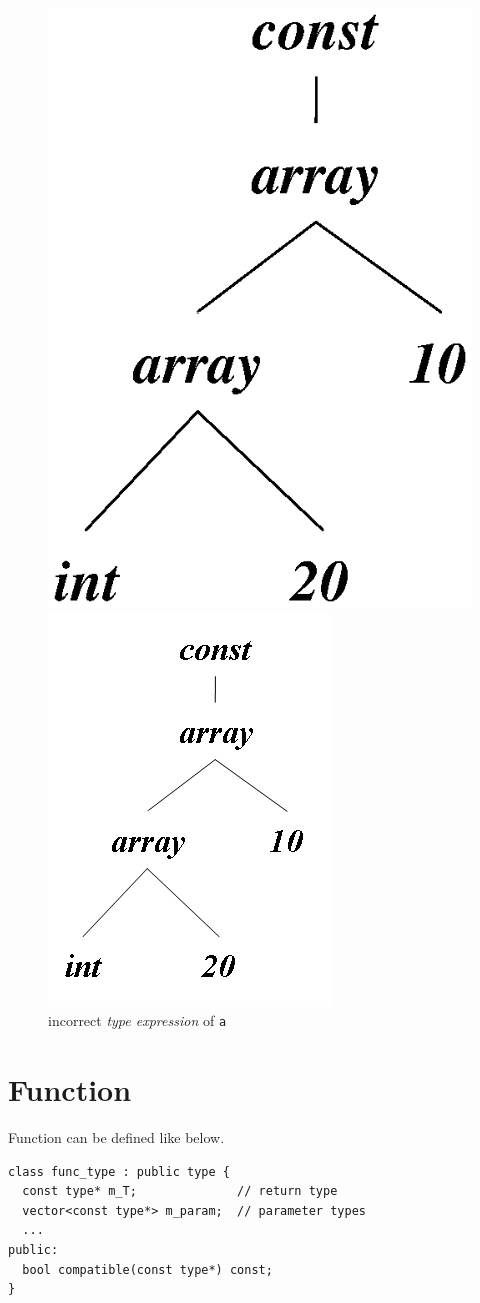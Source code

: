 \begin{figure}[htbp]
\begin{center}
\begin{latexonly}
\includegraphics[width=0.4\linewidth,height=0.5\linewidth]{incorrect_array.eps}
\end{latexonly}
\begin{htmlonly}
\includegraphics{incorrect_array.png}
\end{htmlonly}
\caption{incorrect {\em type expression} of {\tt{a}}}
\label{type008}
\end{center}
\end{figure}

\section{Function}

Function can be defined like below.
\begin{verbatim}
class func_type : public type {
  const type* m_T;              // return type
  vector<const type*> m_param;  // parameter types
  ...
public:
  bool compatible(const type*) const;
}
\end{verbatim}

